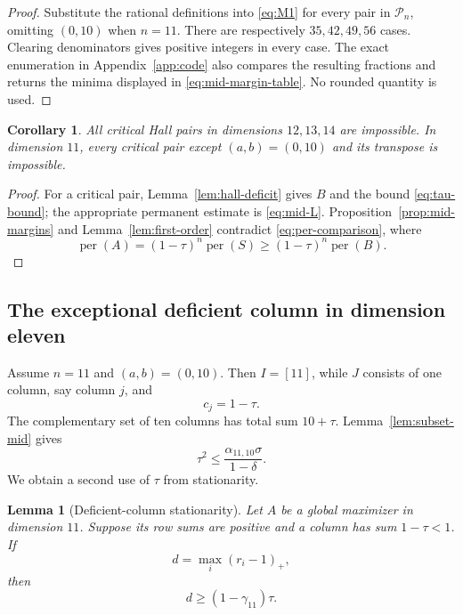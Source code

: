 \documentclass[11pt,a4paper]{article}
\numberwithin{equation}{section}
\newtheorem{lemma}[theorem]{Lemma}
\newtheorem{corollary}[theorem]{Corollary}
\theoremstyle{definition}
\newcommand{\per}{\operatorname{per}}
\newcommand{\1}{\mathbf{1}}
\begin{document}
\begin{proof}
Substitute the rational definitions into \eqref{eq:M1} for every pair in $\mathcal P_n$, omitting $(0,10)$ when $n=11$.  There are respectively $35,42,49,56$ cases.  Clearing denominators gives positive integers in every case.  The exact enumeration in Appendix~\ref{app:code} also compares the resulting fractions and returns the minima displayed in \eqref{eq:mid-margin-table}.  No rounded quantity is used.
\end{proof}

\begin{corollary}\label{cor:ordinary-excluded}
All critical Hall pairs in dimensions $12,13,14$ are impossible.  In dimension $11$, every critical pair except $(a,b)=(0,10)$ and its transpose is impossible.
\end{corollary}

\begin{proof}
For a critical pair, Lemma~\ref{lem:hall-deficit} gives $B$ and the bound \eqref{eq:tau-bound}; the appropriate permanent estimate is \eqref{eq:mid-L}.  Proposition~\ref{prop:mid-margins} and Lemma~\ref{lem:first-order} contradict \eqref{eq:per-comparison}, where
\begin{equation}\label{eq:per-comparison}
 \per(A)=(1-\tau)^n\per(S)
 \ge(1-\tau)^n\per(B).
\end{equation}
\end{proof}

\subsection{The exceptional deficient column in dimension eleven}

Assume $n=11$ and $(a,b)=(0,10)$.  Then $I=[11]$, while $J$ consists of one column, say column $j$, and
\begin{equation}\label{eq:deficient-column}
 c_j=1-\tau.
\end{equation}
The complementary set of ten columns has total sum $10+\tau$.  Lemma~\ref{lem:subset-mid} gives
\begin{equation}\label{eq:n11-column}
 \tau^2\le\frac{\alpha_{11,10}\sigma}{1-\delta}.
\end{equation}
We obtain a second use of $\tau$ from stationarity.

\begin{lemma}[Deficient-column stationarity]\label{lem:n11-stationarity}
Let $A$ be a global maximizer in dimension $11$.  Suppose its row sums are positive and a column has sum $1-\tau<1$.  If
\[
 d=\max_i(r_i-1)_+,
\]
then
\begin{equation}\label{eq:n11-d}
 d\ge(1-\gamma_{11})\tau.
\end{equation}
\end{lemma}
\end{document}
